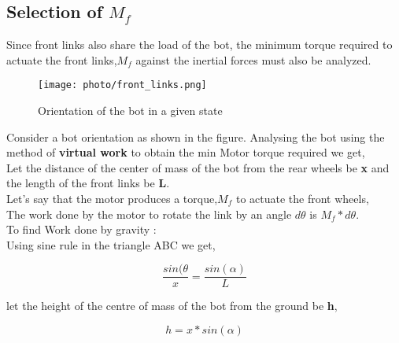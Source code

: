 \subsection {Selection of \textbf{$M_f$}}

Since front links also share the load of the bot, the minimum torque required to actuate the front links,$M_f$ against the inertial forces must also be analyzed.

\begin{figure}[h]
  \begin{center}
  \texttt{[image: photo/front\_links.png]}\\
  \caption{Orientation of the bot in a given state}\label{front_links}
  \end{center}
\end{figure}

Consider a bot orientation as shown in the figure.
Analysing the bot using the method of \textbf{virtual work} to obtain the min Motor torque required we get,\\
Let the distance of the center of mass of the bot from the rear wheels be \textbf{x} and the length of the front links be \textbf{L}.\\
Let's say that the motor produces a torque,$M_f$  to actuate the front wheels,\\
The work done by the motor to rotate the link by an angle $d\theta$ is $M_f * d\theta$.\\
To find Work done by gravity :\\
Using sine rule in the triangle ABC we get,

\begin{equation}\label{sine_rule}
    \frac{sin(\theta}{x} = \frac{sin(\alpha)}{L}
\end{equation}

let the height of the centre of mass of the bot from the ground be \textbf{h},

\begin{equation}
    h = x * sin(\alpha)
\end{equation}

